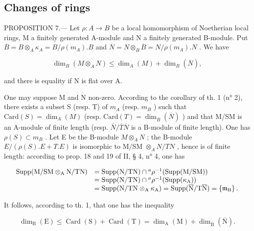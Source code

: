 \subsection{Changes of rings}

PROPOSITION 7.--- Let \(\rho: A \to B\) be a local homomorphism of Noetherian local rings, M a finitely generated A-module and N a finitely generated B-module. Put \(\overline{B} = B \otimes_A \kappa_A = B / \rho(m_A).B\) and \(\overline{N} = N \otimes_B \overline{B} = N / \rho(m_A).N\) . We have

\[
\dim_ {B} (M \otimes_ {A} N) \leqslant \dim_ {A} (M) + \dim_ {B} (\overline {{N}}),\tag{12}
\]

and there is equality if N is flat over A.

One may suppose M and N non-zero. According to the corollary of th. 1 (n° 2), there exists a subset S (resp. T) of \(m_A\) (resp. \(m_B\) ) such that \(\text{Card}(S) = \dim_A(M)\) (resp. \(\text{Card}(T) = \dim_{\overline{B}}(\overline{N})\) ) and that M/SM is an A-module of finite length (resp. \(\overline{N}/\overline{T}\overline{N}\) is a B-module of finite length). One has \(\rho(S) \subset m_B\) . Let E be the B-module \(M \otimes_A N\) ; the B-module \(E/(\rho(S).E + T.E)\) is isomorphic to M/SM \(\otimes_A N/TN\) , hence is of finite length: according to prop. 18 and 19 of II, § 4, n° 4, one has

\[
\begin{array}{r l} \operatorname{Supp} (\mathrm{M} / \mathrm{SM} \otimes_ {\mathrm{A}} \mathrm{N} / \mathrm{TN}) & = \operatorname{Supp} (\mathrm{N} / \mathrm{TN}) \cap {} ^ {a} \rho^ {- 1} (\operatorname{Supp} (\mathrm{M} / \mathrm{SM})) \\ & = \operatorname{Supp} (\mathrm{N} / \mathrm{TN}) \cap {} ^ {a} \rho^ {- 1} (\operatorname{Supp} (\kappa_ {\mathrm{A}})) \\ & = \operatorname{Supp} (\mathrm{N} / \mathrm{TN} \otimes_ {\mathrm{A}} \kappa_ {\mathrm{A}}) = \operatorname{Supp} (\overline {{\mathrm{N}}} / \mathrm{T} \overline {{\mathrm{N}}}) = \left\{\mathfrak {m} _ {\mathrm{B}} \right\}. \end{array}
\]

It follows, according to th. 1, that one has the inequality

\[
\dim_ {\mathrm{B}} (\mathrm{E}) \leqslant \operatorname{Card} (\mathrm{S}) + \operatorname{Card} (\mathrm{T}) = \dim_ {\mathrm{A}} (\mathrm{M}) + \dim_ {\overline {{\mathrm{B}}}} (\overline {{\mathrm{N}}}).
\]

